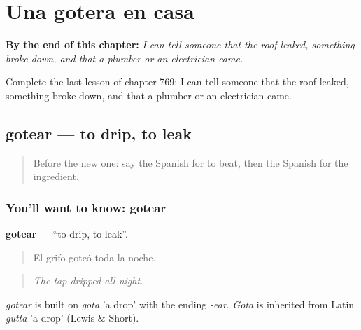 
\chapter{Una gotera en casa}
\label{ch:es-una-gotera-en-casa}

\begin{chapteropening}
\textbf{By the end of this chapter:} \emph{I can tell someone that the roof leaked, something broke down, and that a plumber or an electrician came.}

Complete the last lesson of chapter 769: I can tell someone that the roof leaked, something broke down, and that a plumber or an electrician came.
\end{chapteropening}

\section[gotear]{gotear — to drip, to leak}

\label{lesson:ES-C769-gotear}



\begin{quote}
Before the new one: say the Spanish for to beat, then the Spanish for the ingredient.
\end{quote}

\subsection*{You'll want to know: gotear}
\textbf{gotear} — \textquotedblleft{}to drip, to leak\textquotedblright{}.

\begin{quote}
El grifo goteó toda la noche.
\end{quote}

\begin{quote}
\emph{The tap dripped all night.}
\end{quote}

\begin{cousinweb}
\emph{gotear} is built on \emph{gota} 'a drop' with the ending \emph{-ear}. \emph{Gota} is inherited from Latin \emph{gutta} 'a drop' (Lewis \& Short).
\end{cousinweb}


